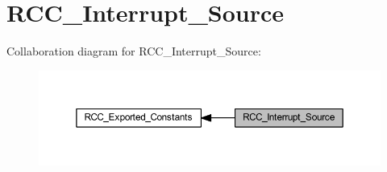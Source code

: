 \hypertarget{group___r_c_c___interrupt___source}{}\section{R\+C\+C\+\_\+\+Interrupt\+\_\+\+Source}
\label{group___r_c_c___interrupt___source}
Collaboration diagram for R\+C\+C\+\_\+\+Interrupt\+\_\+\+Source\+:\nopagebreak
\begin{figure}[H]
\begin{center}
\leavevmode
\includegraphics[width=350pt]{group___r_c_c___interrupt___source}
\end{center}
\end{figure}
